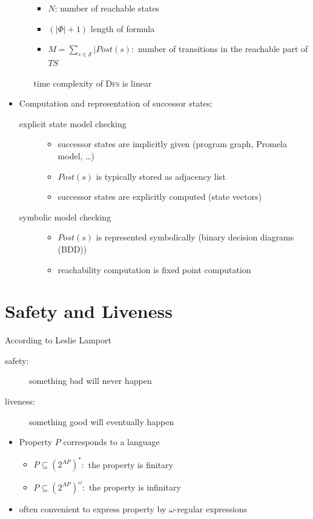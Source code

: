 \documentclass[a4paper, 10pt]{article}
\begin{document}
\begin{itemize}
\begin{itemize}
        \begin{itemize}
            \item $N$: number of reachable states
            \item $(|\Phi|+1)$ length of formula
            \item $M=\sum_{s\in\mathcal{S}}|Post(s):$ number of transitions in the reachable part of $TS$
        \end{itemize}
        \follows time complexity of \textsc{Dfs} is linear
    \end{itemize}
    \item Computation and representation of successor states:
    \begin{description}
        \item[explicit state model checking]
        \begin{itemize}
            \item successor states are implicitly given (program graph, Promela model, \dots)
            \item $Post(s)$ is typically stored as adjacency list
            \item successor states are explicitly computed (state vectors)
        \end{itemize}
        \item[symbolic model checking]
        \begin{itemize}
            \item $Post(s)$ is represented symbolically (binary decision diagrams (BDD))
            \item reachability computation is fixed point computation
        \end{itemize}
    \end{description}
\end{itemize}

\section*{Safety and Liveness}
According to Leslie Lamport
\begin{description}
    \item[safety:] something bad will never happen
    \item[liveness:] something good will eventually happen
\end{description}
\begin{itemize}
    \item Property $P$ corresponds to a language
    \begin{itemize}
        \item $P\subseteq (2^{AP})^*:$ the property is finitary
        \item $P\subseteq (2^{AP})^\omega:$ the property is infinitary
    \end{itemize}
    \item often convenient to express property by $\omega$-regular expressions
\end{itemize}
\end{document}
